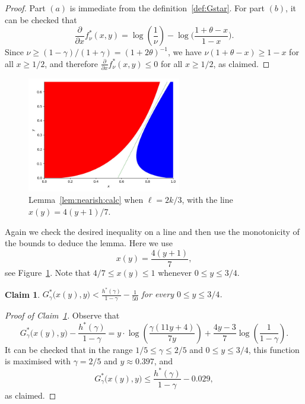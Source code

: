 \documentclass[12pt,reqno]{amsart}
\newtheorem{claim}[theorem]{Claim}
\theoremstyle{definition}
\theoremstyle{remark}
\newenvironment{clmproof}[1]{\begin{proof}[Proof of Claim~\ref{#1}]\let\qednow\qedsymbol\renewcommand{\qedsymbol}{}}{\; \qednow \end{proof}}
\renewcommand{\le}{\leqslant}
\renewcommand{\ge}{\geqslant}
\begin{document}
\begin{proof}
Part $(a)$ is immediate from the definition~\eqref{def:Gstar}. For part $(b)$, it can be checked that 
$$\frac{\partial}{\partial x} f_\nu^*(x,y) = \log \left(\frac{1}{\nu}\right) - \log \bigg( \frac{1 + \theta - x}{1-x} \bigg).$$
Since $\nu \ge (1-\gamma)/(1+\gamma) = (1+2\theta)^{-1}$, we have $\nu(1 + \theta - x) \ge 1 - x$ for all $x \ge 1/2$, and therefore $\frac{\partial}{\partial x} f_\nu^*(x,y) \le 0$ for all $x \ge 1/2$, as claimed. 
\end{proof}


\begin{figure}[h]
\centering
\includegraphics[width=0.6\textwidth]{Figure_offdiag_twofifths_line.jpeg}
    \caption{Lemma~\ref{lem:nearish:calc} when $\ell = 2k/3$, with the line $x(y) = 4(y+1)/7$.}
\label{fig:twofifths:app}
\end{figure}

Again we check the desired inequality on a line and then use the monotonicity of the bounds to deduce the lemma. Here we use
\begin{equation}\label{def:xstar:of:y}
x(y) = \frac{4(y+1)}{7},
\end{equation}
see Figure~\ref{fig:twofifths:app}. Note that $4/7 \le x(y) \le 1$ whenever $0 \le y \le 3/4$. 

\begin{claim}\label{claim:AppB:G}
$G_\gamma^*\big(x(y),y \big) < \displaystyle\frac{h^*(\gamma)}{1-\gamma} - \frac{1}{50}$ for every $0 \le y \le 3/4$. 
\end{claim}
 
\begin{clmproof}{claim:AppB:G}
Observe that
$$G_\gamma^*\big( x(y),y \big) - \frac{h^*(\gamma)}{1-\gamma} = y \cdot \log \left( \frac{\gamma(11y+4)}{7y} \right) + \frac{4y-3}{7} \log \left(\frac{1}{1-\gamma} \right).$$
It can be checked that in the range $1/5 \le \gamma \le 2/5$ and $0 \le y \le 3/4$, this function is maximised with $\gamma = 2/5$ and $y \approx 0.397$, and 
$$G_\gamma^*\big( x(y),y \big) \le \frac{h^*(\gamma)}{1-\gamma} - 0.029,$$
as claimed. 
\end{clmproof}
\end{document}
